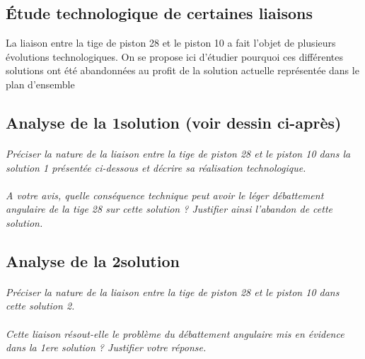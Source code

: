 \documentclass[11pt,oneside]{article}
\begin{document}
\subsection{Étude technologique de certaines liaisons}

La liaison entre la tige de piston 28 et le piston 10 a fait l'objet de plusieurs évolutions technologiques. On se propose ici d'étudier pourquoi ces différentes solutions ont été abandonnées au profit de la solution actuelle représentée dans le plan d'ensemble
\subsection*{Analyse de la 1\iere solution (voir dessin ci-après)}

\paragraph{}
\textit{Préciser la nature de la liaison entre la tige de piston 28 et le piston 10 dans la solution 1 présentée ci-dessous et décrire sa réalisation technologique.}
\paragraph{}
\textit{A votre avis, quelle conséquence technique peut avoir le léger débattement angulaire de la tige 28 sur cette solution ? Justifier ainsi l'abandon de cette solution.}

\subsection*{Analyse de la 2\ieme solution}

\paragraph{}
\textit{Préciser la nature de la liaison entre la tige de piston 28 et le piston 10 dans cette solution 2.}

\paragraph{}
\textit{Cette liaison résout-elle le problème du débattement angulaire mis en évidence dans la 1ere solution ? Justifier votre réponse.}
\end{document}
